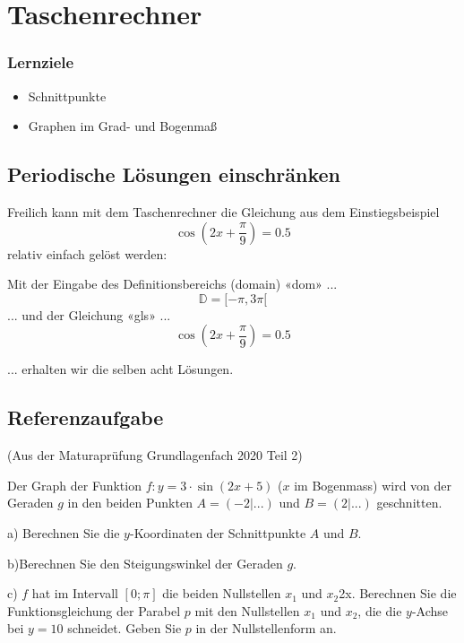 
\section{Taschenrechner}

\subsubsection*{Lernziele}

\begin{itemize}
\item Schnittpunkte
\item Graphen im Grad- und Bogenmaß
\end{itemize}

\subsection{Periodische Lösungen einschränken}
Freilich kann mit dem Taschenrechner die Gleichung aus dem
Einstiegsbeispiel $$\cos\left(2x+\frac{\pi}{9}\right)=0.5$$ relativ einfach gelöst werden:

Mit der Eingabe des Definitionsbereichs (domain) «dom» ...
$$\mathbb{D} =  [ -\pi, 3\pi[$$
... und der Gleichung «gls» ...
$$\cos\left(2x+\frac{\pi}{9}\right) = 0.5$$

... erhalten wir die selben acht Lösungen.
    

\newpage


\subsection{Referenzaufgabe}
(Aus der Maturaprüfung Grundlagenfach 2020 Teil 2)

Der Graph der Funktion $f: y=3\cdot{}\sin(2x+5)$ ($x$ im Bogenmass)  wird von der Geraden $g$ in den beiden Punkten $A=(-2|...)$ und $B=(2|...)$ geschnitten.

a) Berechnen Sie die $y$-Koordinaten der Schnittpunkte $A$ und $B$.

b)Berechnen Sie den Steigungswinkel der Geraden $g$.


c) $f$ hat im Intervall $[0; \pi]$ die beiden Nullstellen $x_1$ und $x_2$2x. Berechnen Sie die Funktionsgleichung der Parabel $p$ mit den Nullstellen $x_1$ und $x_2$, die die $y$-Achse bei $y=10$ schneidet. Geben Sie $p$ in der Nullstellenform an.

